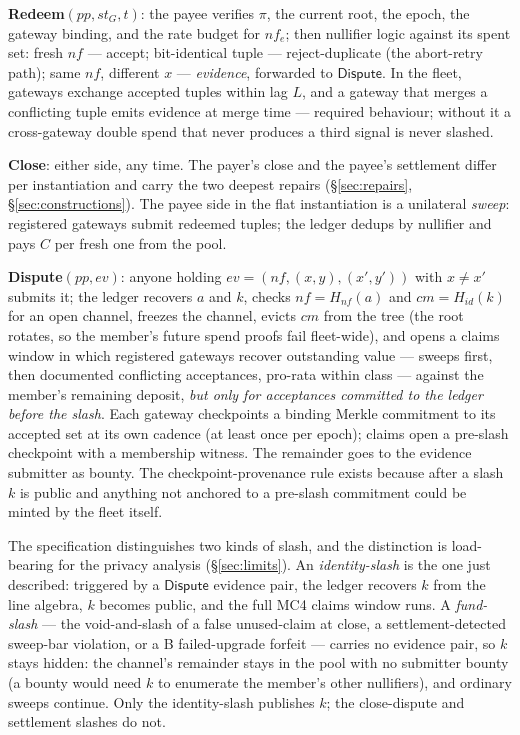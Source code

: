 \documentclass[9pt]{extarticle}
\begin{document}
\textbf{Redeem}$(pp, st_G, t)$: the payee verifies $\pi$, the current
root, the epoch, the gateway binding, and the rate budget for $nf_e$; then
nullifier logic against its spent set: fresh $nf$ --- accept;
bit-identical tuple --- reject-duplicate (the abort-retry path); same
$nf$, different $x$ --- \emph{evidence}, forwarded to $\mathsf{Dispute}$.
In the fleet, gateways exchange accepted tuples within lag $L$, and a
gateway that merges a conflicting tuple emits evidence at merge time ---
required behaviour; without it a cross-gateway double spend that never
produces a third signal is never slashed.

\textbf{Close}: either side, any time. The payer's close and the payee's
settlement differ per instantiation and carry the two deepest repairs
(\S\ref{sec:repairs}, \S\ref{sec:constructions}). The payee side in the
flat instantiation is a unilateral \emph{sweep}: registered gateways
submit redeemed tuples; the ledger dedups by nullifier and pays $C$ per
fresh one from the pool.

\textbf{Dispute}$(pp, ev)$: anyone holding $ev = (nf, (x,y), (x',y'))$
with $x \neq x'$ submits it; the ledger recovers $a$ and $k$, checks
$nf = H_{nf}(a)$ and $cm = H_{id}(k)$ for an open channel, freezes the
channel, evicts $cm$ from the tree (the root rotates, so the member's
future spend proofs fail fleet-wide), and opens a claims window in which
registered gateways recover outstanding value --- sweeps first, then
documented conflicting acceptances, pro-rata within class --- against the
member's remaining deposit, \emph{but only for acceptances committed to
the ledger before the slash}. Each gateway checkpoints a binding Merkle
commitment to its accepted set at its own cadence (at least once per
epoch); claims open a pre-slash checkpoint with a membership witness. The
remainder goes to the evidence submitter as bounty. The
checkpoint-provenance rule exists because after a slash $k$ is public and
anything not anchored to a pre-slash commitment could be minted by the
fleet itself.

The specification distinguishes two kinds of slash, and the distinction is
load-bearing for the privacy analysis (\S\ref{sec:limits}). An
\emph{identity-slash} is the one just described: triggered by a
$\mathsf{Dispute}$ evidence pair, the ledger recovers $k$ from the line
algebra, $k$ becomes public, and the full MC4 claims window runs. A
\emph{fund-slash} --- the void-and-slash of a false unused-claim at close,
a settlement-detected sweep-bar violation, or a B failed-upgrade forfeit
--- carries no evidence pair, so $k$ stays hidden: the channel's remainder
stays in the pool with no submitter bounty (a bounty would need $k$ to
enumerate the member's other nullifiers), and ordinary sweeps continue.
Only the identity-slash publishes $k$; the close-dispute and settlement
slashes do not.
\end{document}
